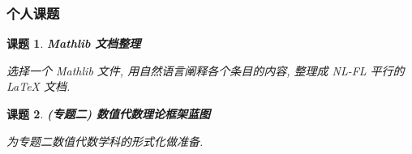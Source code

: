 \documentclass[UTF8]{ctexart}
\DeclareMathOperator{\0}{\mathbf{0}}                    %
\newcommand{\<}{\langle}
\renewcommand{\>}{\rangle}                              %
\newenvironment{xmp_box}{
    \begin{tcolorbox}[enhanced, colback=xmp_purple2, boxrule=0pt, frame hidden,
        borderline west={0.7mm}{0.1mm}{xmp_purple1},breakable]
    }
    {\end{tcolorbox}}
\theoremstyle{MyStyle} %
\newtheorem{project}{课题}
\newenvironment{prj}[1]
{
    \begin{xmp_box}
        \begin{project}
            \textbf{#1}
            \newline
}
{
        \end{project}
    \end{xmp_box}
}
\begin{document}
        \subsubsection{个人课题}
            
            \begin{prj}
                {Mathlib 文档整理}
                选择一个 Mathlib 文件, 用自然语言阐释各个条目的内容, 整理成 NL-FL 平行的 LaTeX 文档. 
            \end{prj}

            \begin{prj}
                {(专题二) 数值代数理论框架蓝图}
                为专题二数值代数学科的形式化做准备. 
            \end{prj}
\end{document}
